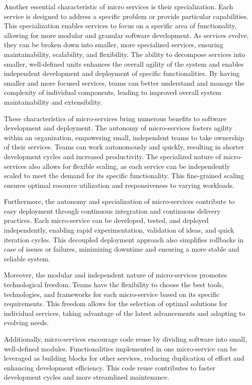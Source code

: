 \documentclass[
12pt,
oneside, 
onehalfspacing, 
nolistspacing, 
parskip, 
chapterinoneline, 
]{AASTCOMPUTER}
\begin{document}
Another essential characteristic of micro services is their specialization. Each service is designed to address a specific problem or provide particular capabilities. This specialization enables services to focus on a specific area of functionality, allowing for more modular and granular software development. As services evolve, they can be broken down into smaller, more specialized services, ensuring maintainability, scalability, and flexibility. The ability to decompose services into smaller, well-defined units enhances the overall agility of the system and enables independent development and deployment of specific functionalities. By having smaller and more focused services, teams can better understand and manage the complexity of individual components, leading to improved overall system maintainability and extensibility.

These characteristics of micro-services bring numerous benefits to software development and deployment. The autonomy of micro-services fosters agility within an organization, empowering small, independent teams to take ownership of their services. Teams can work autonomously and quickly, resulting in shorter development cycles and increased productivity. The specialized nature of micro-services also allows for flexible scaling, as each service can be independently scaled to meet the demand for its specific functionality. This fine-grained scaling ensures optimal resource utilization and responsiveness to varying workloads.

Furthermore, the autonomy and specialization of micro-services contribute to easy deployment through continuous integration and continuous delivery practices. Each micro-service can be developed, tested, and deployed independently, enabling rapid experimentation, validation of ideas, and quick iteration cycles. This decoupled deployment approach also simplifies rollbacks in case of issues or failures, minimizing downtime and ensuring a more stable and reliable system.

Moreover, the modular and independent nature of micro-services promotes technological freedom. Teams have the flexibility to choose the best tools, technologies, and frameworks for each micro-service based on its specific requirements. This freedom allows for the selection of optimal solutions for individual services, taking advantage of the latest advancements and adapting to evolving needs.

Additionally, micro-services encourage code reuse by dividing software into small, well-defined modules. Functionalities implemented in one micro-service can be leveraged as building blocks for other services, reducing duplication of effort and enhancing development efficiency. This code reuse contributes to faster development cycles and more streamlined maintenance.
\end{document}
